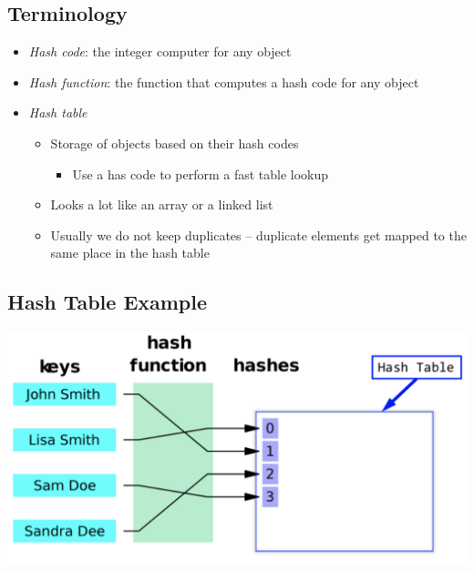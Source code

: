 \documentclass[10pt]{article}
\begin{document}
\subsection*{Terminology}
\begin{itemize}
    \item \textit{Hash code}: the integer computer for any object
    \item \textit{Hash function}: the function that computes a hash code for any object
    \item \textit{Hash table}
    \begin{itemize}
        \item Storage of objects based on their hash codes
        \begin{itemize}
            \item Use a has code to perform a fast table lookup
        \end{itemize}
        \item Looks a lot like an array or a linked list
        \item Usually we do not keep duplicates -- duplicate elements get mapped to the same place in the hash table
    \end{itemize}
\end{itemize}

\subsection*{Hash Table Example}
\begin{center}
    \includegraphics[width=0.5\linewidth]{images/1.png}    
\end{center}
\end{document}
